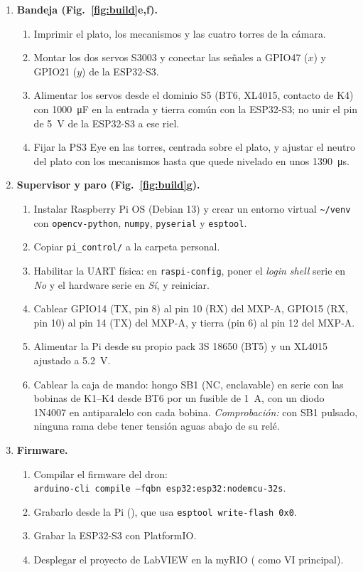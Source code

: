 \begin{enumerate}[label=\textbf{Paso \arabic*.}, leftmargin=*, align=left]
  \item \textbf{Bandeja (Fig.~\ref{fig:build}e,f).}
  \begin{enumerate}[label=(\alph*)]
    \item Imprimir el plato, los mecanismos y las cuatro torres de la cámara.
    \item Montar los dos servos S3003 y conectar las señales a GPIO47 ($x$) y GPIO21 ($y$) de la ESP32-S3.
    \item Alimentar los servos desde el dominio S5 (BT6, XL4015, contacto de K4) con \SI{1000}{\micro\farad} en la entrada y tierra común con la ESP32-S3; no unir el pin de \SI{5}{\volt} de la ESP32-S3 a ese riel.
    \item Fijar la PS3 Eye en las torres, centrada sobre el plato, y ajustar el neutro del plato con los mecanismos hasta que quede nivelado en unos \SI{1390}{\micro\second}.
  \end{enumerate}

  \item \textbf{Supervisor y paro (Fig.~\ref{fig:build}g).}
  \begin{enumerate}[label=(\alph*)]
    \item Instalar Raspberry Pi OS (Debian 13) y crear un entorno virtual \texttt{\textasciitilde/venv} con \texttt{opencv-python}, \texttt{numpy}, \texttt{pyserial} y \texttt{esptool}.
    \item Copiar \texttt{pi\_control/} a la carpeta personal.
    \item Habilitar la UART física: en \texttt{raspi-config}, poner el \emph{login shell} serie en \emph{No} y el hardware serie en \emph{Sí}, y reiniciar.
    \item Cablear GPIO14 (TX, pin 8) al pin 10 (RX) del MXP-A, GPIO15 (RX, pin 10) al pin 14 (TX) del MXP-A, y tierra (pin 6) al pin 12 del MXP-A.
    \item Alimentar la Pi desde su propio pack 3S 18650 (BT5) y un XL4015 ajustado a \SI{5.2}{\volt}.
    \item Cablear la caja de mando: hongo SB1 (NC, enclavable) en serie con las bobinas de K1--K4 desde BT6 por un fusible de \SI{1}{\ampere}, con un diodo 1N4007 en antiparalelo con cada bobina. \emph{Comprobación:} con SB1 pulsado, ninguna rama debe tener tensión aguas abajo de su relé.
  \end{enumerate}

  \item \textbf{Firmware.}
  \begin{enumerate}[label=(\alph*)]
    \item Compilar el firmware del dron:\\ \texttt{arduino-cli compile --fqbn esp32:esp32:nodemcu-32s}.
    \item Grabarlo desde la Pi (), que usa \texttt{esptool write-flash 0x0}.
    \item Grabar la ESP32-S3 con PlatformIO.
    \item Desplegar el proyecto de LabVIEW en la myRIO ( como VI principal).
  \end{enumerate}


\end{enumerate}
